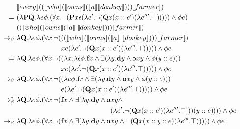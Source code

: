 \begin{example}
\begin{align}
& \trr{\I{every}}  ((\trr{\I{who}}  (\trr{\I{owns}}  (\trr{\I{a}}  \trr{\I{donkey}} ) )) \trr{\I{farmer}}  )  \notag \\
= \ & ( \lambda \P2 \Q2. \lambda e \phi. (\forall \x1. \neg (\P2 \x1 e (\lambda e'. \neg (\Q2 \x1 (\upii{\x1}{e'})  (\lambda e'''. \top)  ))))  \land \phi e) \notag \\
&  ((\trr{\I{who}}  (\trr{\I{owns}}  (\trr{\I{a}} \ \trr{\I{donkey}} ) )) \trr{\I{farmer}}  )   \notag \\
\bconv \ &   \lambda  \Q2. \lambda e \phi. (\forall \x1. \neg ( ((\trr{\I{who}}  (\trr{\I{owns}}  (\trr{\I{a}} \ \trr{\I{donkey}} ) )) \trr{\I{farmer}}  ) \notag \\
& \phantom{\lambda  \Q2. \lambda e \phi. (\forall \x1. \neg (} \x1 e (\lambda e'. \neg (\Q2 \x1 (\upii{\x1}{e'})  (\lambda e'''. \top)  ))))  \land \phi e  \notag \\
= \ &    \lambda  \Q2. \lambda e \phi. (\forall \x1. \neg ( (  \lambda   \x1. \lambda e \phi. \cfarmer \x1 \land   \exists (\lambda \y1.  \cdonkey \y1  \land  \cown \x1 \y1 \land \phi (\upii{\y1}{e}) )  )  \notag  \\
& \phantom{\lambda  \Q2. \lambda e \phi. (\forall \x1. \neg (} \x1 e (\lambda e'. \neg (\Q2 \x1 (\upii{\x1}{e'})  (\lambda e'''. \top)  ))))  \land \phi e  \notag \\
\bconv \ &     \lambda  \Q2. \lambda e \phi. (\forall \x1. \neg ( (  \lambda e \phi. \cfarmer \x1 \land   \exists (\lambda \y1.  \cdonkey \y1  \land  \cown \x1 \y1 \land \phi (\upii{\y1}{e}) )  )  \notag \\
& \phantom{\lambda  \Q2. \lambda e \phi. (\forall \x1. \neg (} e (\lambda e'. \neg (\Q2 \x1 (\upii{\x1}{e'})  (\lambda e'''. \top)  ))))  \land \phi e  \notag \\
\bred \ &   \lambda  \Q2. \lambda e \phi. (\forall \x1. \neg ( \cfarmer \x1 \land   \exists (\lambda \y1.  \cdonkey \y1  \land  \cown \x1 \y1 \land  \notag \\
& \phantom{\lambda  \Q2. \lambda e \phi. (\forall \x1. \neg ( \cfarmer \x1 \land   \exists (\lambda \y1.  \cdonkey \y1  \land  \cown}
(\lambda e'. \neg (\Q2 \x1 (\upii{\x1}{e'})  (\lambda e'''. \top)  )) (\upii{\y1}{e}) ) ))  \land \phi e  \notag \\
\bconv \ &   \lambda  \Q2. \lambda e \phi. (\forall \x1. \neg ( \cfarmer \x1 \land   \exists (\lambda \y1.  \cdonkey \y1  \land  \cown \x1 \y1 \land  \neg (\Q2 \x1 (\upii{\x1}{\upii{\y1}{e}})  (\lambda e'''. \top)  ) ) ))  \land \phi e  \label{eq:everyfarmerwhoownsadonkey-nf-2006}
\end{align}



\end{example}

